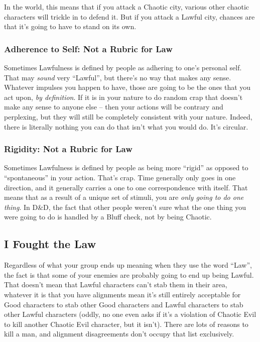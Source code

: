 In the world, this means that if you attack a Chaotic city, various other chaotic characters will trickle in to defend it. But if you attack a Lawful city, chances are that it's going to have to stand on its own.

\subsubsection{Adherence to Self: Not a Rubric for Law}
Sometimes Lawfulness is defined by people as adhering to one's personal self. That may \textit{sound} very ``Lawful'', but there's no way that makes any sense. Whatever impulses you happen to have, those are going to be the ones that you act upon, \textit{by definition}. If it is in your nature to do random crap that doesn't make any sense to anyone else -- then your actions will be contrary and perplexing, but they will still be completely consistent with your nature. Indeed, there is literally nothing you can do that isn't what you would do. It's circular.

\subsubsection{Rigidity: Not a Rubric for Law}
Sometimes Lawfulness is defined by people as being more ``rigid'' as opposed to ``spontaneous'' in your action. That's crap. Time generally only goes in one direction, and it generally carries a one to one correspondence with itself. That means that as a result of a unique set of stimuli, you are \textit{only going to do one thing}. In D\&D, the fact that other people weren't sure what the one thing you were going to do is handled by a Bluff check, not by being Chaotic.


\subsection{I Fought the Law}

Regardless of what your group ends up meaning when they use the word ``Law'', the fact is that some of your enemies are probably going to end up being Lawful. That doesn't mean that Lawful characters can't stab them in their area, whatever it is that you have alignments mean it's still entirely acceptable for Good characters to stab other Good characters and Lawful characters to stab other Lawful characters (oddly, no one even asks if it's a violation of Chaotic Evil to kill another Chaotic Evil character, but it isn't). There are lots of reasons to kill a man, and alignment disagreements don't occupy that list exclusively.


